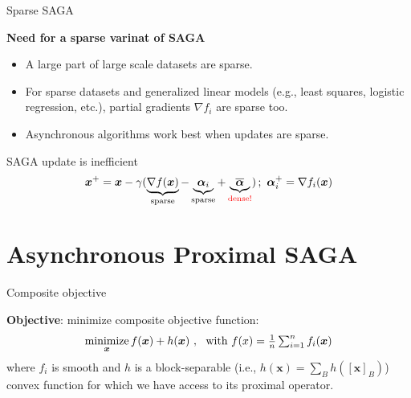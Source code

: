 \documentclass[10pt]{beamer}
\begin{document}
\begin{frame}{Sparse SAGA}

{\bfseries Need for a sparse varinat of SAGA}
\begin{itemize}
\item A large part of large scale datasets are sparse.
\item For sparse datasets and generalized linear models (e.g., least squares, logistic regression, etc.), partial gradients $\nabla f_i$ are sparse too.
\item Asynchronous algorithms work best when updates are sparse.
\end{itemize}

\vspace{1em}
SAGA update is inefficient
$$
{\boldsymbol x}^+ = {\boldsymbol x} - \gamma (\underbrace{\nabla f({\boldsymbol x})}_{\text{sparse}} - \underbrace{{\boldsymbol \alpha}_i}_{\text{sparse}} + \underbrace{\overline{{\boldsymbol \alpha}}}_{\color{red}\text{dense!}})\,;~{\boldsymbol \alpha}_i^+ = \nabla f_i({\boldsymbol x})
$$

\end{frame}

\section{Asynchronous Proximal SAGA}



\begin{frame}{Composite objective}

\vspace{5mm}
{\bfseries Objective}: minimize composite objective function:
$$
\operatorname*{minimize}_{{\boldsymbol x}} f({\boldsymbol x}) + h({\boldsymbol x})~,~ \text{ with $f(x) = \textstyle \frac{1}{n}\sum_{i=1}^n f_i({\boldsymbol x})$}
$$
where $f_i$ is smooth and $h$ is a block-separable (i.e., $h(\boldsymbol{x}) = \sum_{B} h([\boldsymbol{x}]_B)$) convex function for which we have access to its proximal operator.
\end{frame}
\end{document}
